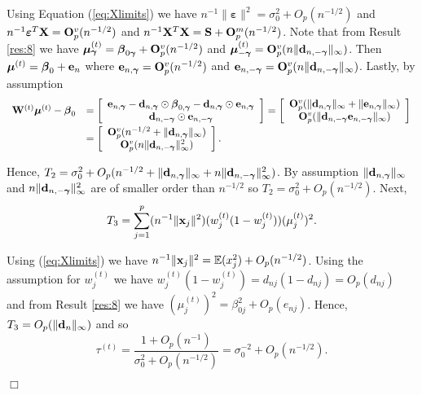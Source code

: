 \documentclass[11pt]{article}
\newtheorem{Main Result}{Main Result}
\def\vectorfontone{\bf}
\def\vectorfonttwo{\boldsymbol}
\def\vb{{\vectorfontone b}}                      %
\def\vd{{\vectorfontone d}}                      %
\def\ve{{\vectorfontone e}}                      %
\def\vx{{\vectorfontone x}}                      %
\def\vbeta{{\vectorfonttwo \beta}}               %
\def\vgamma{{\vectorfonttwo \gamma}}             %
\def\vvarepsilon{{\vectorfonttwo \varepsilon}}   %
\def\vmu{{\vectorfonttwo \mu}}                   %
\def\matrixfontone{\bf}
\def\mI{{\matrixfontone I}}                      %
\def\mO{{\matrixfontone O}}                      %
\def\mS{{\matrixfontone S}}                      %
\def\mW{{\matrixfontone W}}                      %
\def\mX{{\matrixfontone X}}                      %
\def\bE{{\mathbb E}}                             %
\def\ds{\displaystyle}
\def\diag{\text{diag}}
\begin{document}
\noindent Using Equation (\ref{eq:Xlimits}) we have
$n^{-1}\| \vvarepsilon \|^2 = \sigma_0^2 + O_p(n^{-1/2})$ and
$n^{-1}\vvarepsilon^T\mX = \mO_p^v(n^{-1/2})$
and $n^{-1}\mX^T\mX = \mS + \mO_p^m(n^{-1/2})$.
Note that from Result \ref{res:8} we have
$\vmu_\vgamma^{(t)} = \vbeta_{0\vgamma} + \mO_p^v(n^{-1/2})$
and $\vmu_{-\vgamma}^{(t)} = \mO_p^v(n\|\vd_{n,-\vgamma}\|_\infty)$.
Then $\vmu^{(t)} = \vbeta_0 + \ve_n$ where
$\ve_{n,\vgamma}=\mO_p^v(n^{-1/2})$ and $\ve_{n,-\vgamma}=\mO_p^v(n\|\vd_{n,-\vgamma}\|_\infty)$. Lastly, by assumption
$$
\begin{array}{rl}
\mW^{(t)}\vmu^{(t)} - \vbeta_0
& \ds = \left[
\begin{array}{c}
\ve_{n,\vgamma} - \vd_{n,\vgamma} \odot \vbeta_{0,\vgamma} - \vd_{n,\vgamma} \odot \ve_{n,\vgamma}  \\
\vd_{n,-\vgamma}\odot\ve_{n,-\vgamma}
\end{array}
\right] =
\left[
\begin{array}{c}
\mO_p^v(\|\vd_{n,\vgamma}\|_\infty + \|\ve_{n,\vgamma}\|_\infty) \\
\mO_p^v(\|\vd_{n,-\vgamma}\ve_{n,-\vgamma}\|_\infty)
\end{array}
\right] \\ [2ex]
& \ds =
\left[
\begin{array}{c}
\mO_p^v(n^{-1/2} + \|\vd_{n,\vgamma}\|_\infty) \\
\mO_p^v(n\|\vd_{n,-\vgamma}\|^2_\infty)
\end{array}
\right].
\end{array}
$$

\noindent Hence,
$T_2 = \sigma_0^2 + O_p(n^{-1/2} + \|\vd_{n,\vgamma}\|_\infty + n\|\vd_{n,-\vgamma}\|^2_\infty)$.
By assumption $\|\vd_{n,\vgamma}\|_\infty$ and $n\|\vd_{n,-\vgamma}\|^2_\infty$ are of smaller order than
$n^{-1/2}$ so $T_2 = \sigma_0^2 + O_p(n^{-1/2})$.
Next,
$$
T_3 = \sum_{j=1}^p
(n^{-1}\|\vx_j\|^2)(w_j^{(t)}(1 - w_j^{(t)}))(\mu_j^{(t)})^2.
$$

\noindent Using (\ref{eq:Xlimits}) we have
$n^{-1}\|\vx_j\|^2 = \bE(x_j^2) + O_p(n^{-1/2})$.
Using the assumption for $w_j^{(t)}$ we have
$w_j^{(t)}(1 - w_j^{(t)}) = d_{nj}(1 - d_{nj}) = O_p(d_{nj})$
and from Result \ref{res:8} we have
$(\mu_j^{(t)})^2 = \beta^2_{0j} + O_p(e_{nj})$. Hence,
$T_3 = O_p(\|\vd_n\|_\infty)$ and so
$$
\ds \tau^{(t)}
= \frac{1 + O_p(n^{-1})}{
	\sigma_0^2 + O_p(n^{-1/2})} =
\sigma_0^{-2} + O_p(n^{-1/2}).
$$
\vspace{-1cm}\begin{flushright}$\Box$\end{flushright}
\end{document}
